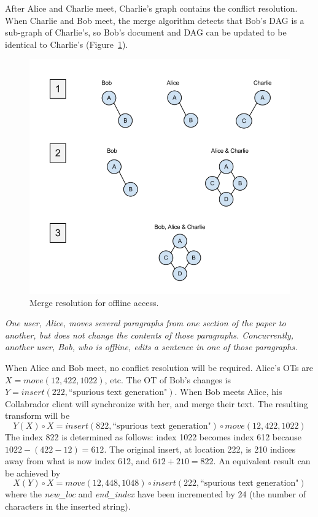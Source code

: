 \documentclass[11pt,titlepage]{article}
\begin{document}
After Alice and Charlie meet, Charlie's graph contains the conflict
resolution.  When Charlie and Bob meet, the merge algorithm detects
that Bob's DAG is a sub-graph of Charlie's, so Bob's document and DAG
can be updated to be identical to Charlie's (Figure~\ref{fig:image}).

\begin{figure}[ht]
  \centering
  \includegraphics[width=5in]{image.png}
  \caption{Merge resolution for offline access.  \label{fig:image}}
\end{figure}

\vspace{5mm}
\noindent
\emph{One user, Alice, moves several paragraphs from one section of
  the paper to another, but does not change the contents of those
  paragraphs. Concurrently, another user, Bob, who is offline, edits a
  sentence in one of those paragraphs.}

\vspace{5mm}

When Alice and Bob meet, no conflict resolution will be
required. Alice's OTs are $X = move(12,422, 1022)$, etc.  The OT of
Bob's changes is $Y = insert(222, \text{``spurious text
  generation"})$. When Bob meets Alice, his Collabrador client will
synchronize with her, and merge their text. The resulting transform
will be
\begin{equation*}
  Y(X) \circ X = insert(822,
  \text{``spurious text generation"}) \circ move(12,422, 1022)
\end{equation*}
The index 822 is determined as follows: index 1022 becomes index 612
because \(1022-(422-12) = 612.\) The original insert, at location 222,
is 210 indices away from what is now index 612, and \(612+210 = 822.\)
An equivalent result can be achieved by
\begin{equation*}
  X(Y) \circ X = move(12,448,1048) \circ insert(222, \text{``spurious text generation"})
\end{equation*}
where the \textit{new\_loc} and \textit{end\_index} have been
incremented by 24 (the number of characters in the inserted string).
\end{document}
